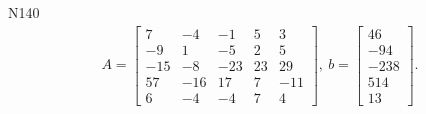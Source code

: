 \documentclass[11pt]{report}
\begin{document}
N140
\begin{align*}
 A = \left[\begin{matrix}7 & -4 & -1 & 5 & 3\\-9 & 1 & -5 & 2 & 5\\-15 & -8 & -23 & 23 & 29\\57 & -16 & 17 & 7 & -11\\6 & -4 & -4 & 7 & 4\end{matrix}\right],
\ b = \left[\begin{matrix}46\\-94\\-238\\514\\13\end{matrix}\right]. 
 \end{align*}
\end{document}
